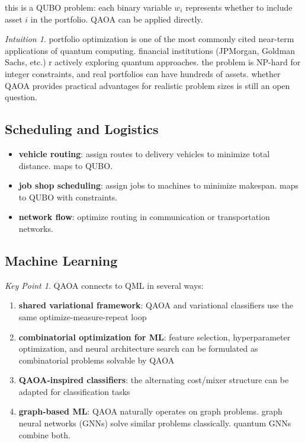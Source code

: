 \documentclass[11pt,a4paper]{article}
\theoremstyle{definition}
\theoremstyle{remark}
\newtheorem*{intuition}{Intuition}
\newtheorem*{keypoint}{Key Point}
\begin{document}
this is a QUBO problem: each binary variable $w_i$ represents whether to include asset $i$ in the portfolio. QAOA can be applied directly.

\begin{intuition}
portfolio optimization is one of the most commonly cited near-term applications of quantum computing. financial institutions (JPMorgan, Goldman Sachs, etc.) r actively exploring quantum approaches. the problem is NP-hard for integer constraints, and real portfolios can have hundreds of assets. whether QAOA provides practical advantages for realistic problem sizes is still an open question.
\end{intuition}

\subsection{Scheduling and Logistics}

\begin{itemize}
    \item \textbf{vehicle routing}: assign routes to delivery vehicles to minimize total distance. maps to QUBO.
    \item \textbf{job shop scheduling}: assign jobs to machines to minimize makespan. maps to QUBO with constraints.
    \item \textbf{network flow}: optimize routing in communication or transportation networks.
\end{itemize}

\subsection{Machine Learning}

\begin{keypoint}
QAOA connects to QML in several ways:
\begin{enumerate}
    \item \textbf{shared variational framework}: QAOA and variational classifiers use the same optimize-measure-repeat loop
    \item \textbf{combinatorial optimization for ML}: feature selection, hyperparameter optimization, and neural architecture search can be formulated as combinatorial problems solvable by QAOA
    \item \textbf{QAOA-inspired classifiers}: the alternating cost/mixer structure can be adapted for classification tasks
    \item \textbf{graph-based ML}: QAOA naturally operates on graph problems. graph neural networks (GNNs) solve similar problems classically. quantum GNNs combine both.
\end{enumerate}
\end{keypoint}
\end{document}
